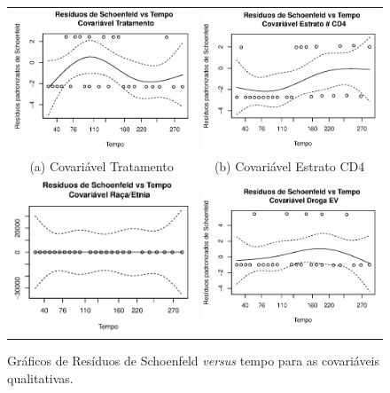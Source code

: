 \documentclass[
	12pt,				%
	openright,			%
	twoside,			%
	a4paper,			%
	english,			%
	brazil				%
	]{abntex2}
\begin{document}
\begin{figure}[!ht]
  \caption{Gráficos de Resíduos de Schoenfeld \textit{versus} tempo para as covariáveis qualitativas.}
  \begin{tabular}{cc}
    \label{fig:expdif1}
  \includegraphics[width=65mm]{Rplot14} &   \includegraphics[width=65mm]{Rplot15} \\
(a) Covariável Tratamento & (b) Covariável Estrato CD4 \\[6pt]
 \includegraphics[width=65mm]{Rplot18} &   \includegraphics[width=65mm]{Rplot19} \\

\end{tabular}
\end{figure}
\end{document}
